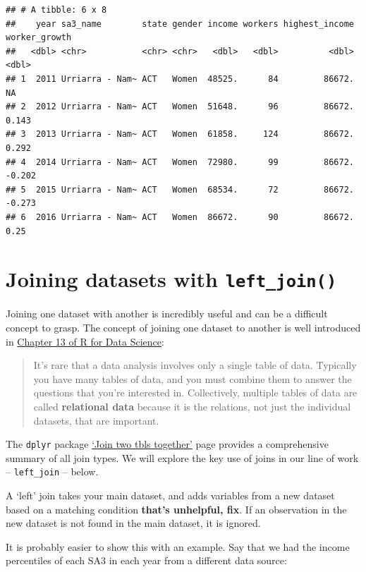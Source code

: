 \documentclass[]{book}
\begin{document}
\begin{verbatim}
## # A tibble: 6 x 8
##    year sa3_name        state gender income workers highest_income worker_growth
##   <dbl> <chr>           <chr> <chr>   <dbl>   <dbl>          <dbl>         <dbl>
## 1  2011 Urriarra - Nam~ ACT   Women  48525.      84         86672.        NA    
## 2  2012 Urriarra - Nam~ ACT   Women  51648.      96         86672.         0.143
## 3  2013 Urriarra - Nam~ ACT   Women  61858.     124         86672.         0.292
## 4  2014 Urriarra - Nam~ ACT   Women  72980.      99         86672.        -0.202
## 5  2015 Urriarra - Nam~ ACT   Women  68534.      72         86672.        -0.273
## 6  2016 Urriarra - Nam~ ACT   Women  86672.      90         86672.         0.25
\end{verbatim}

\hypertarget{joining-datasets-with-left_join}{%
\section{\texorpdfstring{Joining datasets with \texttt{left\_join()}}{Joining datasets with left\_join()}}\label{joining-datasets-with-left_join}}

Joining one dataset with another is incredibly useful and can be a difficult concept to grasp. The concept of joining one dataset to another is well introduced in \href{https://r4ds.had.co.nz/relational-data.html}{Chapter 13 of R for Data Science}:

\begin{quote}
It's rare that a data analysis involves only a single table of data. Typically you have many tables of data, and you must combine them to answer the questions that you're interested in. Collectively, multiple tables of data are called \textbf{relational data} because it is the relations, not just the individual datasets, that are important.
\end{quote}

The \texttt{dplyr} package \href{https://dplyr.tidyverse.org/reference/join.html}{`Join two tbls together'} page provides a comprehensive summary of all join types. We will explore the key use of joins in our line of work -- \texttt{left\_join} -- below.

A `left' join takes your main dataset, and adds variables from a new dataset based on a matching condition \textbf{that's unhelpful, fix}. If an observation in the new dataset is not found in the main dataset, it is ignored.

It is probably easier to show this with an example. Say that we had the income percentiles of each SA3 in each year from a different data source:
\end{document}
